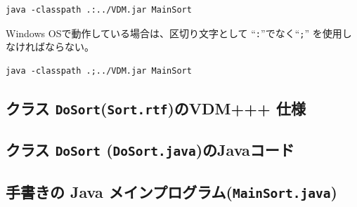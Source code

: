 \documentclass[\pformat,11pt]{jarticle}
\begin{document}
\begin{screen}
\begin{verbatim}
java -classpath .:../VDM.jar MainSort
\end{verbatim}
\end{screen}

Windows OSで動作している場合は、区切り文字として ``{\tt :}''でなく``{\tt ;}'' を使用しなければならない。

\begin{screen}
\begin{verbatim}
java -classpath .;../VDM.jar MainSort
\end{verbatim}
\end{screen}

\subsection{クラス \texttt{DoSort}(\texttt{Sort.rtf})のVDM+++ 仕様}
\label{sec:vdmDoSort}

\subsection{クラス \texttt{DoSort} (\texttt{DoSort.java})のJavaコード}
\label{sec:javaDoSort}
\begin{small}
\end{small}

\subsection{手書きの Java メインプログラム(\texttt{MainSort.java})}
\label{sec:main}
\end{document}
